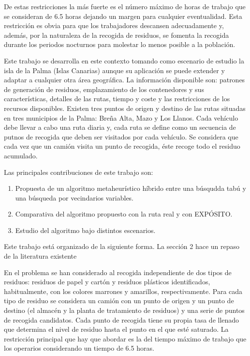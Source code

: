 \documentclass[
]{article}
\providecommand{\tightlist}{%
  \setlength{\itemsep}{0pt}\setlength{\parskip}{0pt}}
\begin{document}
De estas restricciones la más fuerte es el número máximo de horas de
trabajo que se consideran de 6.5 horas dejando un margen para cualquier
eventualidad. Esta restricción es obvia para que los trabajadores
descansen adecuadamente y, además, por la naturaleza de la recogida de
residuos, se fomenta la recogida durante los periodos nocturnos para
molestar lo menos posible a la población.

Este trabajo se desarrolla en este contexto tomando como escenario de
estudio la isla de la Palma (Islas Canarias) aunque su aplicación se
puede extender y adaptar a cualquier otra área geográfica. La
información disponible son: patrones de generación de residuos,
emplazamiento de los contenedores y sus características, detalles de las
rutas, tiempo y coste y las restricciones de los recursos disponibles.
Existen tres puntos de origen y destino de las rutas situadas en tres
municipios de la Palma: Breña Alta, Mazo y Los Llanos. Cada vehículo
debe llevar a cabo una ruta diaria y, cada ruta se define como un
secuencia de putnos de recogida que deben ser visitados por cada
vehículo. Se considera que cada vez que un camión visita un punto de
recogida, éste recoge todo el residuo acumulado.

Las principales contribuciones de este trabajo son:

\begin{enumerate}
\def\labelenumi{\arabic{enumi}.}
\tightlist
\item
  Propuesta de un algoritmo metaheurístico híbrido entre una búsqudda
  tabú y una búsqueda por vecindarios variables.
\item
  Comparativa del algoritmo propuesto con la ruta real y con EXPÓSITO.
\item
  Estudio del algoritmo bajo distintos escenarios.
\end{enumerate}

Este trabajo está organizado de la siguiente forma. La sección 2 hace un
repaso de la literatura existente

En el problema se han considerado al recogida independiente de dos tipos
de residuos: residuos de papel y cartón y residuos plásticos
identificados, habitualmente, con los colores marrones y amarillos,
respectivamente. Para cada tipo de residuo se considera un camión con un
punto de origen y un punto de destino (el almacén y la planta de
tratamiento de residuos) y una serie de puntos de recogida candidatos.
Cada punto de recogida tiene su propia tasa de llenado que determina el
nivel de residuo hasta el punto en el que esté saturado. La restricción
principal que hay que abordar es la del tiempo máximo de trabajo que los
operarios considerando un tiempo de 6.5 horas.
\end{document}
